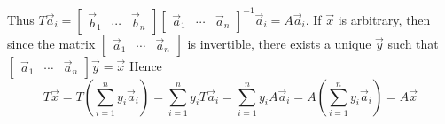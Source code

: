 \documentclass{ximera}
\begin{document}
\begin{problem}
\begin{hint}
Thus $T\vec{a}_{i}=\left[
\begin{array}{ccc}
\vec{b}_{1} & \cdots & \vec{b}_{n}
\end{array}
\right] \left[
\begin{array}{ccc}
\vec{a}_{1} & \cdots & \vec{a}_{n}
\end{array}
\right] ^{-1}\vec{a}_{i} =  A\vec{a}_{i}.$ If $\vec{x}$ is
arbitrary, then since the matrix $\left[
\begin{array}{ccc}
\vec{a}_{1} & \cdots & \vec{a}_{n}
\end{array}
\right] $ is invertible, there exists a unique $\vec{y}$ such that $
\left[
\begin{array}{ccc}
\vec{a}_{1} & \cdots & \vec{a}_{n}
\end{array}
\right] \vec{y}=\vec{x}$ Hence
\[
T\vec{x}=T\left( \sum_{i=1}^{n}y_{i}\vec{a}_{i}\right)
=\sum_{i=1}^{n}y_{i}T\vec{a}_{i}=\sum_{i=1}^{n}y_{i}A\vec{a}
_{i}=A\left( \sum_{i=1}^{n}y_{i}\vec{a}_{i}\right) =A\vec{x}
\]

\end{hint}
\end{problem}
\end{document}
